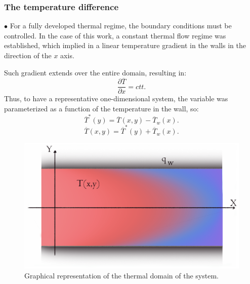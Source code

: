 \documentclass[xcolor=dvipsnames,8pt,aspectratio=34]{beamer}
\begin{document}
		\begin{frame}
			\frametitle{The temperature difference}
			$\bullet$ For a fully developed thermal regime, the boundary conditions must be controlled. In the case of this work, a constant thermal flow regime was established, which implied in a linear temperature gradient in the walls in the direction of the $x$ axis.  \\
			\begin{minipage}[h!]{0.36\textwidth}
				Such gradient extends over the entire domain, resulting in:
				\begin{equation}
				\frac{\partial \overline{T}}{\partial x} = ctt.
				\end{equation}
				Thus, to have a representative one-dimensional system, the variable was parameterized as a function of the temperature in the wall, so:
				\begin{equation}
				\overline{T}^\ast(y) = \overline{T}(x,y)  - \overline{T}_w(x) .
				\end{equation}
				\begin{equation}
				\overline{T}(x,y) = \overline{T}^\ast(y) + \overline{T}_w(x).
				\end{equation}
			\end{minipage}\hfill
			\begin{minipage}[h!]{0.60\textwidth}
			\begin{figure}
				\centering
				\includegraphics[angle=0, scale=0.14]{imagemtermico}
				\caption{Graphical representation of the thermal domain of the system.}
				\label{temperatura}
			\end{figure}
			\end{minipage}
		\end{frame}
		
		
		
\end{document}

